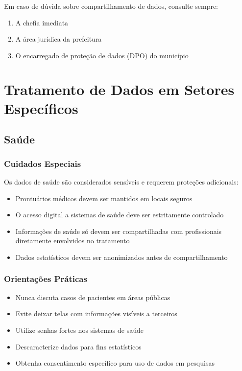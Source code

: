 \documentclass[12pt,a4paper]{article}
\begin{document}
\begin{tcolorbox}[colback=amareloclaro, colframe=orange!75!black, title=Como Proceder]
Em caso de dúvida sobre compartilhamento de dados, consulte sempre:
\begin{enumerate}
    \item A chefia imediata
    \item A área jurídica da prefeitura
    \item O encarregado de proteção de dados (DPO) do município
\end{enumerate}
\end{tcolorbox}

\newpage
\section{Tratamento de Dados em Setores Específicos}

\subsection{Saúde}

\subsubsection{Cuidados Especiais}
Os dados de saúde são considerados sensíveis e requerem proteções adicionais:
\begin{itemize}
    \item Prontuários médicos devem ser mantidos em locais seguros
    \item O acesso digital a sistemas de saúde deve ser estritamente controlado
    \item Informações de saúde só devem ser compartilhadas com profissionais diretamente envolvidos no tratamento
    \item Dados estatísticos devem ser anonimizados antes de compartilhamento
\end{itemize}

\subsubsection{Orientações Práticas}
\begin{itemize}
    \item Nunca discuta casos de pacientes em áreas públicas
    \item Evite deixar telas com informações visíveis a terceiros
    \item Utilize senhas fortes nos sistemas de saúde
    \item Descaracterize dados para fins estatísticos
    \item Obtenha consentimento específico para uso de dados em pesquisas
\end{itemize}
\end{document}
